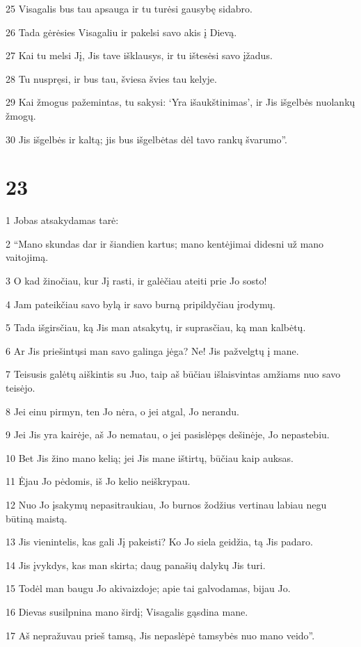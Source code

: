 \par 25 Visagalis bus tau apsauga ir tu turėsi gausybę sidabro. 
\par 26 Tada gėrėsies Visagaliu ir pakelsi savo akis į Dievą. 
\par 27 Kai tu melsi Jį, Jis tave išklausys, ir tu ištesėsi savo įžadus. 
\par 28 Tu nuspręsi, ir bus tau, šviesa švies tau kelyje. 
\par 29 Kai žmogus pažemintas, tu sakysi: ‘Yra išaukštinimas’, ir Jis išgelbės nuolankų žmogų. 
\par 30 Jis išgelbės ir kaltą; jis bus išgelbėtas dėl tavo rankų švarumo”.



\chapter{23}


\par 1 Jobas atsakydamas tarė: 
\par 2 “Mano skundas dar ir šiandien kartus; mano kentėjimai didesni už mano vaitojimą. 
\par 3 O kad žinočiau, kur Jį rasti, ir galėčiau ateiti prie Jo sosto! 
\par 4 Jam pateikčiau savo bylą ir savo burną pripildyčiau įrodymų. 
\par 5 Tada išgirsčiau, ką Jis man atsakytų, ir suprasčiau, ką man kalbėtų. 
\par 6 Ar Jis priešintųsi man savo galinga jėga? Ne! Jis pažvelgtų į mane. 
\par 7 Teisusis galėtų aiškintis su Juo, taip aš būčiau išlaisvintas amžiams nuo savo teisėjo. 
\par 8 Jei einu pirmyn, ten Jo nėra, o jei atgal, Jo nerandu. 
\par 9 Jei Jis yra kairėje, aš Jo nematau, o jei pasislėpęs dešinėje, Jo nepastebiu. 
\par 10 Bet Jis žino mano kelią; jei Jis mane ištirtų, būčiau kaip auksas. 
\par 11 Ėjau Jo pėdomis, iš Jo kelio neiškrypau. 
\par 12 Nuo Jo įsakymų nepasitraukiau, Jo burnos žodžius vertinau labiau negu būtiną maistą. 
\par 13 Jis vienintelis, kas gali Jį pakeisti? Ko Jo siela geidžia, tą Jis padaro. 
\par 14 Jis įvykdys, kas man skirta; daug panašių dalykų Jis turi. 
\par 15 Todėl man baugu Jo akivaizdoje; apie tai galvodamas, bijau Jo. 
\par 16 Dievas susilpnina mano širdį; Visagalis gąsdina mane. 
\par 17 Aš nepražuvau prieš tamsą, Jis nepaslėpė tamsybės nuo mano veido”.



